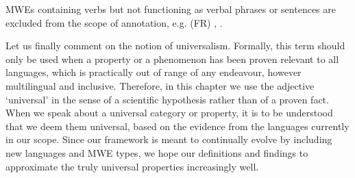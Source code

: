 \documentclass[output=paper,
modfonts,
]{langscibook}
\begin{document}
MWEs containing verbs but not functioning as verbal phrases or sentences  
are excluded from the scope of annotation, e.g. (FR) , .

Let us finally comment on the notion of universalism. Formally, this term should only be used when a property or a phenomenon has been proven relevant to all languages, which is practically out of range of any endeavour, however multilingual and inclusive. Therefore, in this chapter we use the adjective `universal' in the sense of a scientific hypothesis rather than of a proven fact. When we speak about a universal category or property, it is to be understood that we deem them universal, based on the evidence from the languages currently in our scope. Since our framework is meant to continually evolve by including new languages and MWE types, we hope our definitions and findings to approximate the truly universal properties increasingly well.
\end{document}
